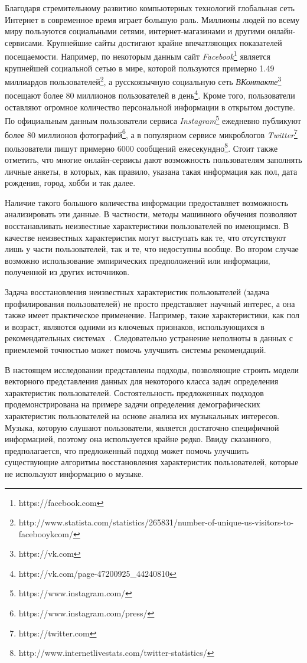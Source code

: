 \startprefacepage

Благодаря стремительному развитию компьютерных технологий глобальная
сеть Интернет в современное время играет большую роль. Миллионы
людей по всему миру пользуются социальными сетями, интернет-магазинами
и другими онлайн-сервисами. Крупнейшие сайты достигают крайне
впечатляющих показателей посещаемости. Например, по некоторым данным 
сайт \textit{Facebook}\footnote{https://facebook.com}
является крупнейшей социальной сетью в мире, которой пользуются
примерно 1.49 миллиардов пользователей\footnote{http://www.statista.com/statistics/265831/number-of-unique-us-visitors-to-facebooykcom/},
а русскоязычную социальную сеть \textit{ВКонтакте}\footnote{https://vk.com}
посещают более 80 миллионов пользователей в 
день\footnote{https://vk.com/page-47200925\_44240810}. Кроме того,
пользователи оставляют огромное количество персональной информации 
в открытом доступе. По официальным данным пользователи сервиса 
\textit{Instagram}\footnote{https://www.instagram.com/} ежедневно
публикуют более 80 миллионов 
фотографий\footnote{https://www.instagram.com/press/}, а
в популярном сервисе микроблогов \textit{Twitter}\footnote{https://twitter.com}
пользователи пишут примерно 6000 сообщений
ежесекундно\footnote{http://www.internetlivestats.com/twitter-statistics/}.
Стоит также отметить, что многие онлайн-сервисы дают
возможность пользователям заполнять личные анкеты,
в которых, как правило, указана такая информация как
пол, дата рождения, город, хобби и так далее.

Наличие такого большого количества информации предоставляет возможность
анализировать эти данные. В частности, методы машинного обучения 
позволяют восстанавливать неизвестные характеристики пользователей по имеющимся.
В качестве неизвестных характеристик могут выступать как те,
что отсутствуют лишь у части пользователей, так и те, что недоступны
вообще. Во втором случае возможно использование эмпирических
предположений или информации, полученной из других источников.

Задача восстановления неизвестных характеристик пользователей 
(задача профилирования пользователей) не просто представляет
научный интерес, а она также имеет практическое применение. 
Например, такие характеристики, как пол и возраст, являются
одними из ключевых признаков, использующихся в рекомендательных
системах~\cite{swearingen2001beyond,adomavicius2005toward}.
Следовательно устранение неполноты в данных с приемлемой точностью
может помочь улучшить системы рекомендаций.

В настоящем исследовании представлены подходы, позволяющие
строить модели векторного представления данных для некоторого класса
задач определения характеристик пользователей. Состоятельность
предложенных подходов продемонстрирована на примере задачи определения
демографических характеристик пользователей на основе анализа их
музыкальных интересов. Музыка, которую слушают пользователи, является
достаточно специфичной информацией, поэтому она используется крайне редко.
Ввиду сказанного, предполагается, что предложенный подход может помочь
улучшить существующие алгоритмы восстановления характеристик пользователей,
которые не используют информацию о музыке.
